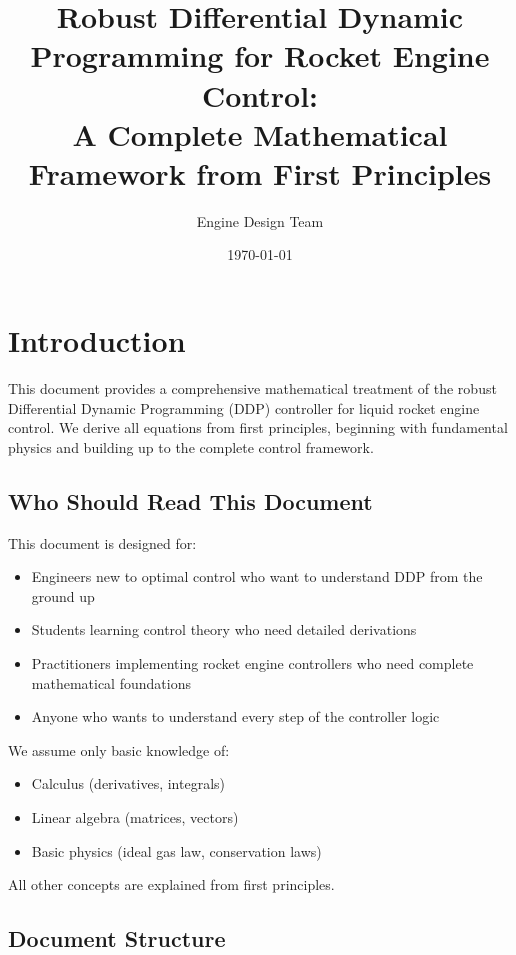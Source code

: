 \documentclass[11pt,a4paper]{article}
\title{Robust Differential Dynamic Programming for Rocket Engine Control:\\
A Complete Mathematical Framework from First Principles}
\author{Engine Design Team}
\date{\today}
\begin{document}
\maketitle

\tableofcontents
\newpage

\section{Introduction}

This document provides a comprehensive mathematical treatment of the robust Differential Dynamic Programming (DDP) controller for liquid rocket engine control. We derive all equations from first principles, beginning with fundamental physics and building up to the complete control framework.

\subsection{Who Should Read This Document}

This document is designed for:
\begin{itemize}
    \item Engineers new to optimal control who want to understand DDP from the ground up
    \item Students learning control theory who need detailed derivations
    \item Practitioners implementing rocket engine controllers who need complete mathematical foundations
    \item Anyone who wants to understand every step of the controller logic
\end{itemize}

We assume only basic knowledge of:
\begin{itemize}
    \item Calculus (derivatives, integrals)
    \item Linear algebra (matrices, vectors)
    \item Basic physics (ideal gas law, conservation laws)
\end{itemize}

All other concepts are explained from first principles.

\subsection{Document Structure}
\end{document}
